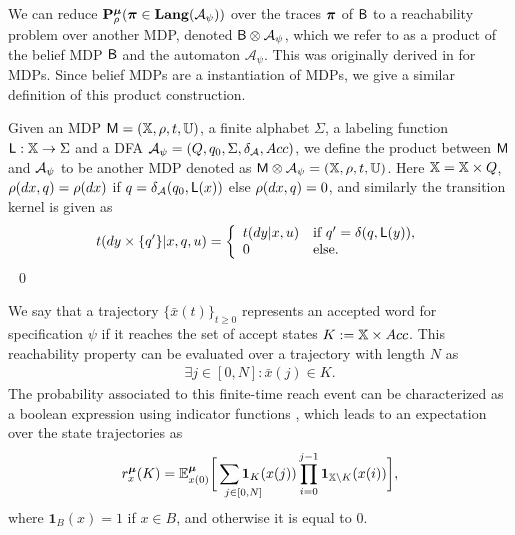 \documentclass{ifacconf}
\newcommand{\red}[1]{{\color{red} #1}}
\newcommand{\new}[1]{{\color{blue}#1}}
\newcommand{\ind}{\mathbf{1}}
\begin{document}
We can
reduce $\mathbf{P}_\rho^{\boldsymbol{\mu}}
({\boldsymbol{\pi}} \in\mathbf{Lang} (\mathcal A_\psi))$  over the traces ${\boldsymbol{\pi}}$ of $\mathsf{B}$ to a reachability problem
 over another MDP,  denoted  $\mathsf{B}\otimes\mathcal A_\psi$, which we refer to as a product of the belief MDP $\mathsf{B}$ and the automaton $\mathcal A_\psi$. This was originally derived in \citep{tmka2013} for MDPs. Since belief MDPs are a instantiation of  MDPs, we give a similar definition of this product construction.
%
\begin{definition}
\label{def:product}
Given an MDP  $\mathsf{M} = ({\mathbb{X}}, \rho, t, {\mathbb{U}})$,
a finite alphabet $\Sigma$,
a labeling function $\mathsf{L}:{\mathbb{X}}\rightarrow\Sigma$
and a DFA  $\mathcal{A}_\psi = (Q, q_0, \Sigma, \delta_{\mathcal{A}}, Acc)$,
we define the product between $\mathsf{M}$ and $\mathcal{A}_\psi$ to be another MDP denoted as
$\mathsf{M}\otimes\mathcal{A}_\psi = (\relax {\mathbb{X}}, \relax\rho,\relax{t},{\mathbb{U}})$.
Here $\relax {\mathbb{X}}= {\mathbb{X}}\times Q$, $\relax\rho(dx,q) = \rho(dx)$ if $q= \delta_{\mathcal{A}}(q_0,\mathsf L(x))$ else $ \relax\rho(dx,q) =0$, and similarly the transition kernel is given as  
\begin{equation*}
  \relax{t}(d y\times\{q'\}|x,q,u) =  \left\{\begin{array}{ll}t(dy|x,u)& \text{if } q' =\delta(q,\mathsf{L}(y)),\\ 0 & \text{else.}  \end{array}\right.
\end{equation*} 
\hfill \mbox{ }\qed
\end{definition}


\new{
We say that a trajectory $
\{\bar x(t)\}_{t\geq 0}$  represents an accepted word for specification $\psi$ if it reaches the set of accept states $K:={\mathbb{X}}\times Acc$.
This reachability property can be evaluated over a   trajectory with length $N$ as 
\begin{align*}\textstyle
\exists j \in [0,N]: \bar x(j) \in K.\end{align*}
The probability associated to this finite-time reach  event can be characterized as a boolean expression using indicator functions \cite{Abate1},
which leads to 
an expectation over the state trajectories as 
\begin{align*} 
r_{\bar x }^\polb(K)=\mathbb{E}_{\bar x(0)}^{\bar \polb}\bigg[\sum\limits_{\mathclap{\qquad j\in[0,N]}}\ind_{K}(\bar x(j))\prod_{i=0}^{j-1}\ind_{\bar{\X}\setminus K}(\bar x(i))\bigg],
\end{align*} 
where $\ind_{B}(x) = 1$ if $x \in B$, 
and otherwise it is equal to $0$.  }
\end{document}
